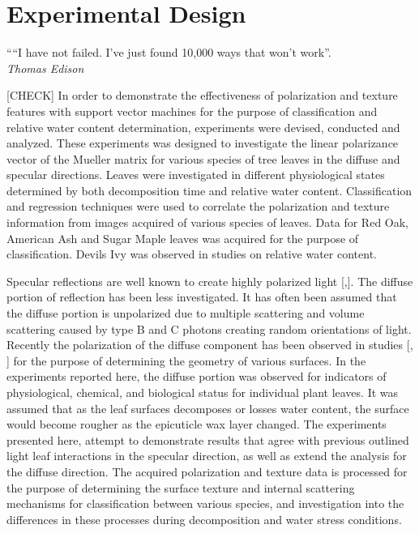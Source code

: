 \chapter{Experimental Design}
\begin{center}
  \begin{minipage}{0.75\textwidth}
    \begin{small}
      ““I have not failed. I've just found 10,000 ways that won't work”.\\
      \null\hfill\emph{Thomas Edison}
    \end{small}
  \end{minipage}
  \vspace{0.5cm}
\end{center}

[CHECK] In order to demonstrate the effectiveness of polarization and texture features with support vector machines for the purpose of classification and relative water content determination, experiments were devised, conducted and analyzed. These experiments was designed to investigate the linear polarizance vector of the Mueller matrix for various species of tree leaves in the diffuse and specular directions.  Leaves were investigated in different physiological states determined by both decomposition time and relative water content.  Classification and regression techniques were used to correlate the polarization and texture information from images acquired of various species of leaves.  Data for Red Oak, American Ash and Sugar Maple leaves was acquired for the purpose of classification.  Devils Ivy was observed in studies on relative water content.

Specular reflections are well known to create highly polarized light [\cite{grant},\cite{vanderbilt}]. The diffuse portion of reflection has been less investigated.  It has often been assumed that the diffuse portion is unpolarized due to multiple scattering and volume scattering caused by type B and C photons creating random orientations of light.  Recently the polarization of the diffuse component has been observed in studies [\cite{surface}, \cite{shapediffuse}] for the purpose of determining the geometry of various surfaces.  In the experiments reported here, the diffuse portion was observed for indicators of physiological, chemical, and biological status for individual plant leaves. It was assumed that as the leaf surfaces decomposes or losses water content, the surface would become rougher as the epicuticle wax layer changed. The experiments presented here, attempt to demonstrate results that agree with previous outlined light leaf interactions in the specular direction, as well as extend the analysis for the diffuse direction.  The acquired polarization and texture data is processed for the purpose of determining the surface texture and internal scattering mechanisms for classification between various species, and investigation into the differences in these processes during decomposition and water stress conditions.

